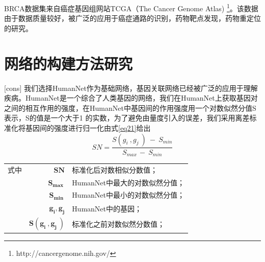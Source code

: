 BRCA数据集来自癌症基因组网站TCGA（The Cancer Genome Atlas) \footnote{http://cancergenome.nih.gov/}。该数据由于数据质量较好，被广泛的应用于癌症通路的识别，药物靶点发现，药物重定位的研究。

\section{网络的构建方法研究}[cons]
\label{cons}
我们选择HumanNet作为基础网络，基因关联网络已经被广泛的应用于理解疾病。HumanNet是一个综合了人类基因的网络，我们在HumanNet上获取基因对之间的相互作用的强度，在HumanNet中基因间的作用强度用一个对数似然分值S表示，S的值是一个大于1 的实数，为了避免由量度引入的误差，我们采用离差标准化将基因间的强度进行归一化由式\ref{eq21}给出
\begin{equation}\label{eq21}
SN=\frac{S( g_{i} \ ,g_{j} \ ) \ -\ S_{min}}{S_{max\ } -\ S_{min}}
\end{equation}

\begin{tabularx}{\textwidth}{@{}l@{\quad}r@{———}X@{}}
式中& $\boldsymbol{SN}$ & 标准化后对数相似分数值；\\
	& $\boldsymbol{S_{max\ }}$ &HumanNet中最大的对数似然分值；\\
	& $\boldsymbol{S_{min\ }}$ &HumanNet中最小的对数似然分值；\\
	 & $\boldsymbol{ g_{i}, g_{j}}$ &HumanNet中的基因；\\
	& $\boldsymbol{S( g_{i} \ ,g_{j} \ )}$ & 标准化之前对数似然分数值；\\
\end{tabularx}\vspace{3.15bp}

